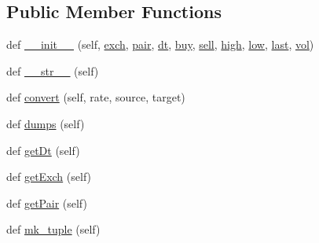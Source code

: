 \subsection*{Public Member Functions}
\begin{DoxyCompactItemize}
\item 
def \hyperlink{classexchange_1_1_ticker_a4a8c99ada461a4aeb960c14020a47736}{\+\_\+\+\_\+init\+\_\+\+\_\+} (self, \hyperlink{classexchange_1_1_ticker_a33f33fe9a12da3ce52938afdc577c061}{exch}, \hyperlink{classexchange_1_1_ticker_a382f9199d13a7b5929a26065fad4e491}{pair}, \hyperlink{classexchange_1_1_ticker_a45e3162d9956cee797f21d93c44c6baf}{dt}, \hyperlink{classexchange_1_1_ticker_a2ca48c3fa9aba92241392a05bef39324}{buy}, \hyperlink{classexchange_1_1_ticker_a5ba9e257d2ed28f02528a37d9ebd793e}{sell}, \hyperlink{classexchange_1_1_ticker_aace381ca15468df6a40e8d86b7710a7f}{high}, \hyperlink{classexchange_1_1_ticker_a1c1f26a47a82fc799fcebf158e104405}{low}, \hyperlink{classexchange_1_1_ticker_add7c2d95fa790dcdffddae2e584ce5f5}{last}, \hyperlink{classexchange_1_1_ticker_a24c0dd396aebc54c06e429a68c964ea3}{vol})
\item 
def \hyperlink{classexchange_1_1_ticker_af91836a1c408f54dda95d9865cefba45}{\+\_\+\+\_\+str\+\_\+\+\_\+} (self)
\item 
def \hyperlink{classexchange_1_1_ticker_afa66aae0fb37d76d4e19bd9d7af79ff9}{convert} (self, rate, source, target)
\item 
def \hyperlink{classexchange_1_1_ticker_a53148d54a0b9b577870db785fb4e381e}{dumps} (self)
\item 
def \hyperlink{classexchange_1_1_ticker_aaa2f7d66782b9405c286e98bfb281d45}{get\+Dt} (self)
\item 
def \hyperlink{classexchange_1_1_ticker_ab31537c5a057f9a47839e2d28411c1cf}{get\+Exch} (self)
\item 
def \hyperlink{classexchange_1_1_ticker_a3600faedb720e664d6fdc89415c01678}{get\+Pair} (self)
\item 
def \hyperlink{classexchange_1_1_ticker_aba1398da3113a7ff17b2496ce92c7238}{mk\+\_\+tuple} (self)
\end{DoxyCompactItemize}
